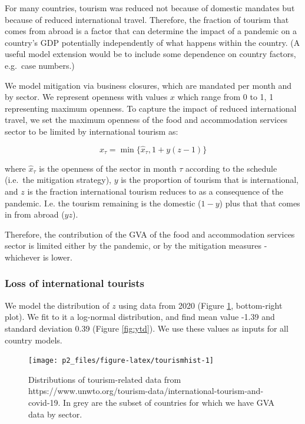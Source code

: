 \documentclass[
]{article}
\begin{document}
For many countries, tourism was reduced not because of domestic mandates but because of reduced international travel. Therefore, the fraction of tourism that comes from abroad is a factor that can determine the impact of a pandemic on a country's GDP potentially independently of what happens within the country. (A useful model extension would be to include some dependence on country factors, e.g.~case numbers.)

We model mitigation via business closures, which are mandated per month and by sector. We represent openness with values \(x\) which range from 0 to 1, 1 representing maximum openness. To capture the impact of reduced international travel, we set the maximum openness of the food and accommodation services sector to be limited by international tourism as:

\[x_\tau = \min\{\hat{x}_\tau, 1+ y(z-1)\}\]

where \(\hat{x}_\tau\) is the openness of the sector in month \(\tau\) according to the schedule (i.e.~the mitigation strategy), \(y\) is the proportion of tourism that is international, and \(z\) is the fraction international tourism reduces to as a consequence of the pandemic. I.e. the tourism remaining is the domestic (\(1-y\)) plus that that comes in from abroad (\(yz\)).

Therefore, the contribution of the GVA of the food and accommodation services sector is limited either by the pandemic, or by the mitigation measures - whichever is lower.

\hypertarget{loss-of-international-tourists}{%
\subsubsection{Loss of international tourists}\label{loss-of-international-tourists}}

We model the distribution of \(z\) using data from 2020 (Figure \ref{fig:tourismhist}, bottom-right plot). We fit to it a log-normal distribution, and find mean value -1.39 and standard deviation 0.39 (Figure \ref{fig:ytd}). We use these values as inputs for all country models.

\begin{figure}

{\centering \texttt{[image: p2\_files/figure-latex/tourismhist-1]} 

}

\caption{Distributions of tourism-related data from https://www.unwto.org/tourism-data/international-tourism-and-covid-19. In grey are the subset of countries for which we have GVA data by sector.}\label{fig:tourismhist}
\end{figure}
\end{document}

